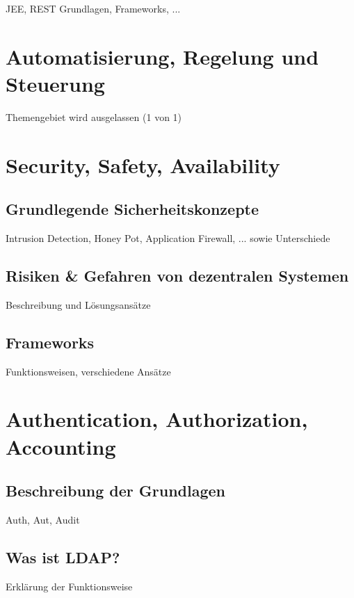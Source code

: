 \documentclass[letterpaper, 12pt]{article}
\let\tempsection\section
\renewcommand\section[1]{\vspace{-0.3cm}\tempsection{#1}\vspace{-0.3cm}}
\let\tempsubsection\subsection
\renewcommand\subsection[1]{\vspace{0cm}\tempsubsection{#1}\vspace{0cm}}
\begin{document}
JEE, REST Grundlagen, Frameworks, ...

\clearpage

\section{Automatisierung, Regelung und Steuerung}

Themengebiet wird ausgelassen (1 von 1)

\clearpage

\section{Security, Safety, Availability}

\subsection{Grundlegende Sicherheitskonzepte}

Intrusion Detection, Honey Pot, Application Firewall, ... sowie Unterschiede

\subsection{Risiken \& Gefahren von dezentralen Systemen}

Beschreibung und Lösungsansätze

\subsection{Frameworks}

Funktionsweisen, verschiedene Ansätze

\clearpage

\section{Authentication, Authorization, Accounting}

\subsection{Beschreibung der Grundlagen}

Auth, Aut, Audit

\subsection{Was ist LDAP?}
Erklärung der Funktionsweise
\end{document}
